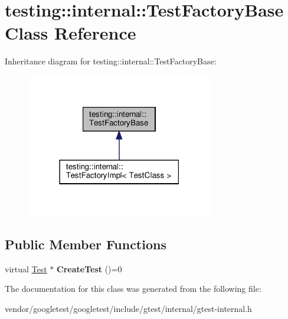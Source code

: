 \hypertarget{classtesting_1_1internal_1_1_test_factory_base}{}\section{testing\+:\+:internal\+:\+:Test\+Factory\+Base Class Reference}
\label{classtesting_1_1internal_1_1_test_factory_base}


Inheritance diagram for testing\+:\+:internal\+:\+:Test\+Factory\+Base\+:
\nopagebreak
\begin{figure}[H]
\begin{center}
\leavevmode
\includegraphics[width=231pt]{classtesting_1_1internal_1_1_test_factory_base__inherit__graph}
\end{center}
\end{figure}
\subsection*{Public Member Functions}
\begin{DoxyCompactItemize}
\item 
\mbox{\label{classtesting_1_1internal_1_1_test_factory_base_a07ac3ca0b196cdb092da0bb186b7c030}} 
virtual \hyperlink{classtesting_1_1_test}{Test} $\ast$ {\bfseries Create\+Test} ()=0
\end{DoxyCompactItemize}


The documentation for this class was generated from the following file\+:\begin{DoxyCompactItemize}
\item 
vendor/googletest/googletest/include/gtest/internal/gtest-\/internal.\+h\end{DoxyCompactItemize}
